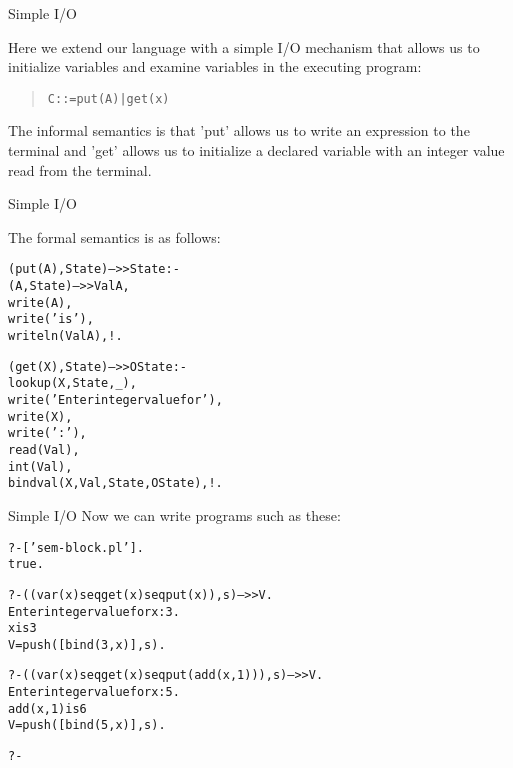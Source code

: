 \documentclass{beamer}
\begin{document}
\begin{frame} [fragile] {Simple I/O}

Here we extend our language with  a simple I/O mechanism that allows
us to initialize variables and examine variables in the executing program:
\begin{quote}
\begin{alltt}
C ::=  put(A)  |  get(x)
\end{alltt}
\end{quote}
The informal semantics is that 'put' allows us to write an expression to the terminal and 
'get' allows us to initialize a declared variable with an integer value read from the terminal.
\end{frame}

\begin{frame} [fragile] {Simple I/O}

The formal semantics is as follows:

\vspace{.1in}

{\scriptsize
\begin{alltt}
(put(A),State) -->> State :-           %io%  writing
    (A,State) -->> ValA,
    write(A),
    write(' is '),
    writeln(ValA),!.

(get(X),State) -->> OState :-          %io% reading
    lookup(X,State,_),
    write('Enter integer value for '),
    write(X),
    write(': '),
    read(Val),
    int(Val),
    bindval(X,Val,State,OState),!.
\end{alltt}
}
\end{frame}

\begin{frame} [fragile] {Simple I/O}
Now we can write programs such as these:
\scriptsize
\begin{alltt}
?- ['sem-block.pl'].
%   xis.pl compiled 0.01 sec, 7,792 bytes
%  preamble.pl compiled 0.01 sec, 8,956 bytes
%  xis.pl compiled 0.00 sec, 148 bytes
% sem-block.pl compiled 0.01 sec, 18,284 bytes
true.

?- ((var(x) seq get(x) seq put(x)),s) -->> V. 
Enter integer value for x: 3.
x is 3
V = push([bind(3, x)], s).

?- ((var(x) seq get(x) seq put(add(x,1))),s) -->> V.
Enter integer value for x: 5.
add(x,1) is 6
V = push([bind(5, x)], s).

?- 
\end{alltt}
\end{frame}
\end{document}
